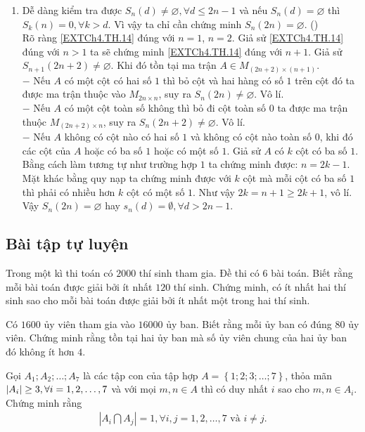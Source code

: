 \begin{bt}[VMO 2018]
{\begin{enumerate}
			\item Dễ dàng kiểm tra được $S_n(d) \neq \varnothing, \forall d \le 2n-1$ và nếu $S_n(d)= \varnothing$ thì $S_k(n)	=0, \forall k>d$. Vì vậy ta chỉ cần chứng minh $S_n(2n)=\varnothing$. \hfill(\theequation)\label{EXTCh4.TH.14} \\
			Rõ ràng \eqref{EXTCh4.TH.14} đúng với $n=1$, $n=2$. Giả sử \eqref{EXTCh4.TH.14} đúng với $n>1$ ta sẽ chứng minh \eqref{EXTCh4.TH.14} đúng với $n+1$. Giả sử $S_{n+1}(2n+2)\neq \varnothing$. Khi đó tồn tại ma trận $A \in M_{(2n+2)\times (n+1)}$. \\
			$-$ Nếu $A$ có một cột có hai số $1$ thì bỏ cột và hai hàng có số $1$ trên cột đó ta được ma trận thuộc vào $M_{2n\times n}$, suy ra $S_n(2n)\neq \varnothing$. Vô lí. \\
			$-$ Nếu $A$ có một cột toàn số không thì bỏ đi cột toàn số $0$ ta được ma trận thuộc $M_{(2n+2)\times n}$, suy ra $S_n(2n+2)\neq \varnothing$. Vô lí.\\
			$-$ Nếu $A$ không có cột nào có hai số $1$ và không có cột nào toàn số $0$, khi đó các cột của $A$ hoặc có ba số $1$ hoặc có một số $1$. Giả sử $A$ có $k$ cột có ba số $1$. Bằng cách làm tương tự như trường hợp $1$ ta chứng minh được: $n=2k-1$. Mặt khác bằng quy nạp ta chứng minh được với $k$ cột mà mỗi cột có ba số $1$ thì phải có nhiều hơn $k$ cột có một số $1$. Như vậy $2k=n+1 \ge 2k+1$, vô lí. Vậy $S_n(2n)=\varnothing$ hay $s_n(d)=\emptyset, \forall d>2n-1$.
		\end{enumerate}
	}
\end{bt}
\subsection{Bài tập tự luyện}
\begin{bt}[IMC 2002]
 Trong một kì thi toán có $2000$ thí sinh tham gia. Đề thi có $6$ bài toán. Biết rằng mỗi bài toán được giải bởi ít nhất $120$ thí sinh. Chứng minh, có ít nhất hai thí sinh sao cho mỗi bài toán được giải bởi ít nhất một trong hai thí sinh.
\end{bt}

\begin{bt}
 Có $1600$ ủy viên tham gia vào $16000$ ủy ban. Biết rằng mỗi ủy ban có đúng $80$ ủy viên. Chứng minh rằng tồn tại hai ủy ban mà số ủy viên chung của hai ủy ban đó không ít hơn $4$.
\end{bt}

\begin{bt}
 Gọi $A_1; A_2;\ldots; A_7$ là các tập con của tập hợp $A=\left\{1;2;3;\ldots;7\right\}$, thỏa mãn $\break |A_i| \ge 3, \forall i=1,2,\ldots,7$ và với mọi $m, n \in A$ thì có duy nhất $i$ sao cho $m, n \in A_i$. Chứng minh rằng
 \begin{eqnarray*}
 	\left|A_i\bigcap A_j \right|=1, \forall i, j=1,2,\ldots,7 \text{ và } i\neq j. 
 \end{eqnarray*}
\end{bt}

